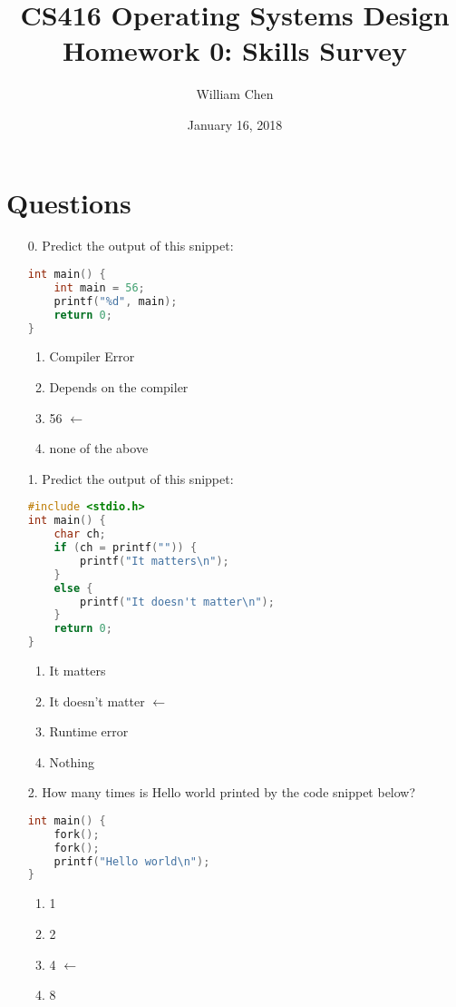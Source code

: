\documentclass[letterpaper, 12pt]{article}
\title{CS416 Operating Systems Design\\Homework 0: Skills Survey}
\author{William Chen}
\date{January 16, 2018}
\begin{document}
\section*{Questions}

\begin{itemize}
	\item [0.] Predict the output of this snippet:

\begin{lstlisting}[language=C, style=c]
int main() {
	int main = 56;
	printf("%d", main);
	return 0;
}
\end{lstlisting}

	\begin{enumerate}[label=(\alph*)]
		\item Compiler Error
		\item Depends on the compiler
		\item 56	$\leftarrow$
		\item none of the above
	\end{enumerate}

	\item [1.] Predict the output of this snippet:

\begin{lstlisting}[language=C, style=c]
#include <stdio.h>
int main() {
	char ch;
	if (ch = printf("")) {
		printf("It matters\n");
	}
	else {
		printf("It doesn't matter\n");
	}
	return 0;
}
\end{lstlisting}

	\begin{enumerate}[label=(\alph*)]
		\item It matters
		\item It doesn't matter	$\leftarrow$
		\item Runtime error
		\item Nothing
	\end{enumerate}


	\item[2.] How many times is Hello world printed by the code snippet below?

\begin{lstlisting}[language=C, style=c]
int main() {
	fork();
	fork();
	printf("Hello world\n");
}
\end{lstlisting}

	\begin{enumerate}[label=(\alph*)]
		\item 1
		\item 2
		\item 4	$\leftarrow$
		\item 8
	\end{enumerate}


\end{itemize}
\end{document}
